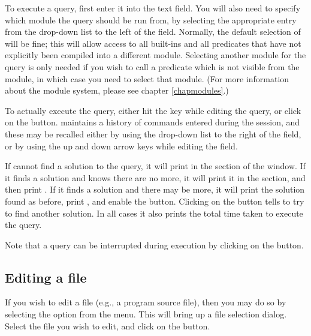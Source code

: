 To execute a query, first enter it into the 
text field.
You will also need to specify which module the query should be run from, by
selecting the appropriate entry from the drop-down list to the left of the
 field.
Normally, the default selection of  will be fine; this will
allow access to all {\eclipse} built-ins and all predicates that have not
explicitly been compiled into a different module.
Selecting another module for the query is only needed if you wish to call a
predicate which is not visible from the  module, in which
case you need to select that module.
(For more information about the module system, please see chapter
\ref{chapmodules}.)

To actually execute the query, either hit the  key while
editing the query, or click on the  button.
{\tkeclipse} maintains a history of commands entered during the session, and
these may be recalled either by using the drop-down list to the right of the
 field, or by using the up and down arrow keys while
editing the  field.

If {\eclipse} cannot find a solution to the query, it will print 
in the  section of the {\tkeclipse} window.
If it finds a solution and knows there are no more, it will print it in the
 section, and then print .
If it finds a solution and there may be more, it will print the solution
found as before, print , and enable the  button.
Clicking on the  button tells {\eclipse} to try to find
another solution.
In all cases it also prints the total time taken to execute the query.

Note that a query can be interrupted during execution by clicking on the
 button.

\subsection{Editing a file}
\label{secedit}

If you wish to edit a file (e.g., a program source file), then you may do so
by selecting the  option from the  menu.
This will bring up a file selection dialog.
Select the file you wish to edit, and click on the  button.

